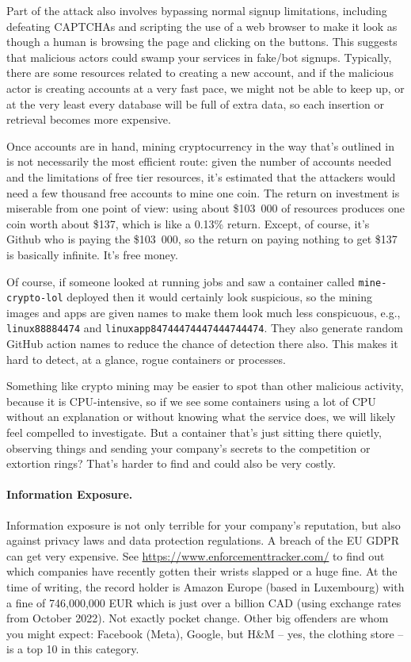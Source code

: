 \documentclass[a4paper]{report}
\begin{document}
Part of the attack also involves bypassing normal signup limitations, including defeating CAPTCHAs and scripting the use of a web browser to make it look as though a human is browsing the page and clicking on the buttons. This suggests that malicious actors could swamp your services in fake/bot signups. Typically, there are some resources related to creating a new account, and if the malicious actor is creating accounts at a very fast pace, we might not be able to keep up, or at the very least every database will be full of extra data, so each insertion or retrieval becomes more expensive.

Once accounts are in hand, mining cryptocurrency in the way that's outlined in~\cite{sysdig} is not necessarily the most efficient route: given the number of accounts needed and the limitations of free tier resources, it's estimated that the attackers would need a few thousand free accounts to mine one coin. The return on investment is miserable from one point of view: using about \$103~000 of resources produces one coin worth about \$137, which is like a 0.13\% return. Except, of course, it's Github who is paying the \$103~000, so the return on paying nothing to get \$137 is basically infinite. It's free money.

Of course, if someone looked at running jobs and saw a container called \texttt{mine-crypto-lol} deployed then it would certainly look suspicious, so the mining images and apps are given names to make them look much less conspicuous, e.g., \texttt{linux88884474} and \texttt{linuxapp84744474447444744474}. They also generate random GitHub action names to reduce the chance of detection there also. This makes it hard to detect, at a glance, rogue containers or processes. 

Something like crypto mining may be easier to spot than other malicious activity, because it is CPU-intensive, so if we see some containers using a lot of CPU without an explanation or without knowing what the service does, we will likely feel compelled to investigate. But a container that's just sitting there quietly, observing things and sending your company's secrets to the competition or extortion rings? That's harder to find and could also be very costly.

\paragraph{Information Exposure.}
Information exposure is not only terrible for your company's reputation, but also against privacy laws and data protection regulations. A breach of the EU GDPR can get very expensive. See \url{https://www.enforcementtracker.com/} to find out which companies have recently gotten their wrists slapped or a huge fine. At the time of writing, the record holder is Amazon Europe (based in Luxembourg) with a fine of 	746,000,000 EUR which is just over a billion CAD (using exchange rates from October 2022). Not exactly pocket change. Other big offenders are whom you might expect: Facebook (Meta), Google, but H\&M -- yes, the clothing store -- is a top 10 in this category.
\end{document}
